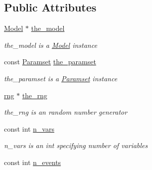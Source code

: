 \subsection*{Public Attributes}
\begin{DoxyCompactItemize}
\item 
\mbox{\label{class_realization_a47ec1d062b8caee874b08c1a17d6aeeb}} 
\hyperlink{class_model}{Model} $\ast$ \hyperlink{class_realization_a47ec1d062b8caee874b08c1a17d6aeeb}{the\+\_\+model}
\begin{DoxyCompactList}\small\item\em the\+\_\+model is a \hyperlink{class_model}{Model} instance \end{DoxyCompactList}\item 
\mbox{\label{class_realization_a119bb29de88929bc51bc1b329473a94b}} 
const \hyperlink{class_paramset}{Paramset} \hyperlink{class_realization_a119bb29de88929bc51bc1b329473a94b}{the\+\_\+paramset}
\begin{DoxyCompactList}\small\item\em the\+\_\+paramset is a \hyperlink{class_paramset}{Paramset} instance \end{DoxyCompactList}\item 
\mbox{\label{class_realization_ac8d358d929afae90cf5790675b6744f9}} 
\hyperlink{classrng}{rng} $\ast$ \hyperlink{class_realization_ac8d358d929afae90cf5790675b6744f9}{the\+\_\+rng}
\begin{DoxyCompactList}\small\item\em the\+\_\+rng is an random number generator \end{DoxyCompactList}\item 
\mbox{\label{class_realization_ad9951a0829e68e12fcb3817735bb5097}} 
const int \hyperlink{class_realization_ad9951a0829e68e12fcb3817735bb5097}{n\+\_\+vars}
\begin{DoxyCompactList}\small\item\em n\+\_\+vars is an int specifying number of variables \end{DoxyCompactList}\item 
\mbox{\label{class_realization_afb711282bef806fc0020f91252d1df2c}} 
const int \hyperlink{class_realization_afb711282bef806fc0020f91252d1df2c}{n\+\_\+events}

\end{DoxyCompactItemize}
